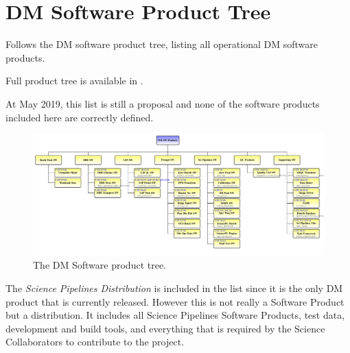 \newpage
\section{DM Software Product Tree}\label{sec:swptree}

Follows the \gls{DM} software product tree, listing all operational \gls{DM} software products.

Full product tree is available in .

At May 2019, this list is still a proposal and none of the software products included here are correctly defined.



\begin{figure}
\begin{center}
 \includegraphics[width=1.1\textwidth]{ProductTreeLand}

 \caption{The \gls{DM} Software product tree.}
 \label{fig:doctree}

\end{center}
\end{figure}

The \textit{Science Pipelines Distribution} is included in the list since it is the only DM product that is currently released.
However this is not really a Software Product but a distribution.
It includes all Science Pipelines Software Products, test data, development and build tools, and everything that is required by the Science Collaborators to contribute to the project.
